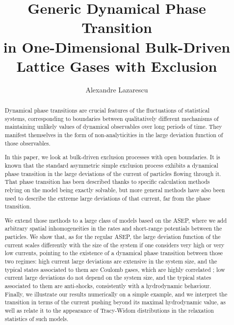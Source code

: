 \documentclass[aps,pre,onecolumn,showpacs,showkeys,a4paper]{revtex4-1}
\begin{document}
\title{Generic Dynamical Phase Transition \\ in One-Dimensional Bulk-Driven Lattice Gases with Exclusion}
\author{Alexandre Lazarescu}
\begin{abstract}
Dynamical phase transitions are crucial features of the fluctuations of statistical systems, corresponding to boundaries between qualitatively different mechanisms of maintaining unlikely values of dynamical observables over long periods of time. They manifest themselves in the form of non-analyticities in the large deviation function of those observables.

In this paper, we look at bulk-driven exclusion processes with open boundaries. It is known that the standard asymmetric simple exclusion process exhibits a dynamical phase transition in the large deviations of the current of particles flowing through it. That phase transition has been described thanks to specific calculation methods relying on the model being exactly solvable, but more general methods have also been used to describe the extreme large deviations of that current, far from the phase transition. 

We extend those methods to a large class of models based on the ASEP, where we add arbitrary spatial inhomogeneities in the rates and short-range potentials between the particles. We show that, as for the regular ASEP, the large deviation function of the current scales differently with the size of the system if one considers very high or very low currents, pointing to the existence of a dynamical phase transition between those two regimes: high current large deviations are extensive in the system size, and the typical states associated to them are Coulomb gases, which are highly correlated ; low current large deviations do not depend on the system size, and the typical states associated to them are anti-shocks, consistently with a hydrodynamic behaviour. Finally, we illustrate our results numerically on a simple example, and we interpret the transition in terms of the current pushing beyond its maximal hydrodynamic value, as well as relate it to the appearance of Tracy-Widom distributions in the relaxation statistics of such models.
\end{abstract}
\end{document}
